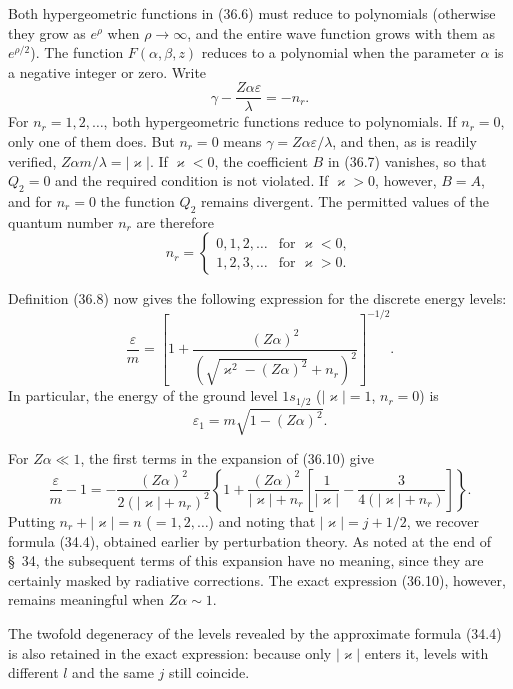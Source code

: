 Both hypergeometric functions in (36.6) must reduce to polynomials (otherwise they grow as $e^\rho$ when $\rho\to\infty$, and the entire wave function grows with them as $e^{\rho/2}$). The function $F(\alpha,\beta,z)$ reduces to a polynomial when the parameter $\alpha$ is a negative integer or zero. Write
\begin{equation}
\gamma-\frac{Z\alpha\varepsilon}{\lambda}=-n_r.
\tag{36.8}
\end{equation}
For $n_r=1,2,\ldots$, both hypergeometric functions reduce to polynomials. If $n_r=0$, only one of them does. But $n_r=0$ means $\gamma=Z\alpha\varepsilon/\lambda$, and then, as is readily verified, $Z\alpha m/\lambda=|\varkappa|$. If $\varkappa<0$, the coefficient $B$ in (36.7) vanishes, so that $Q_2=0$ and the required condition is not violated. If $\varkappa>0$, however, $B=A$, and for $n_r=0$ the function $Q_2$ remains divergent. The permitted values of the quantum number $n_r$ are therefore
\begin{equation}
n_r=\begin{cases}
0,1,2,\ldots&\text{for }\varkappa<0,\\
1,2,3,\ldots&\text{for }\varkappa>0.
\end{cases}
\tag{36.9}
\end{equation}

Definition (36.8) now gives the following expression for the discrete energy levels:
\begin{equation}
\frac\varepsilon m
=\left[1+\frac{(Z\alpha)^2}
{\left(\sqrt{\varkappa^2-(Z\alpha)^2}+n_r\right)^2}\right]^{-1/2}.
\tag{36.10}
\end{equation}
In particular, the energy of the ground level $1s_{1/2}$ ($|\varkappa|=1$, $n_r=0$) is
\[
\varepsilon_1=m\sqrt{1-(Z\alpha)^2}.
\]

For $Z\alpha\ll1$, the first terms in the expansion of (36.10) give
\[
\frac\varepsilon m-1
=-\frac{(Z\alpha)^2}{2(|\varkappa|+n_r)^2}
\left\{1+\frac{(Z\alpha)^2}{|\varkappa|+n_r}
\left[\frac1{|\varkappa|}-\frac3{4(|\varkappa|+n_r)}\right]\right\}.
\]
Putting $n_r+|\varkappa|=n$ ($=1,2,\ldots$) and noting that $|\varkappa|=j+1/2$, we recover formula (34.4), obtained earlier by perturbation theory. As noted at the end of \S~34, the subsequent terms of this expansion have no meaning, since they are certainly masked by radiative corrections. The exact expression (36.10), however, remains meaningful when $Z\alpha\sim1$.

The twofold degeneracy of the levels revealed by the approximate formula (34.4) is also retained in the exact expression: because only $|\varkappa|$ enters it, levels with different $l$ and the same $j$ still coincide.

